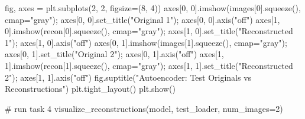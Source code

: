 \documentclass[
  letterpaper,
  DIV=11,
  numbers=noendperiod]{scrartcl}
\newenvironment{Shaded}{\begin{snugshade}}{\end{snugshade}}
\newcommand{\CommentTok}[1]{\textcolor[rgb]{0.37,0.37,0.37}{#1}}
\newcommand{\DecValTok}[1]{\textcolor[rgb]{0.68,0.00,0.00}{#1}}
\newcommand{\NormalTok}[1]{\textcolor[rgb]{0.00,0.23,0.31}{#1}}
\newcommand{\OperatorTok}[1]{\textcolor[rgb]{0.37,0.37,0.37}{#1}}
\newcommand{\StringTok}[1]{\textcolor[rgb]{0.13,0.47,0.30}{#1}}
\begin{document}
\begin{Shaded}
\begin{Highlighting}[]
\NormalTok{    fig, axes }\OperatorTok{=}\NormalTok{ plt.subplots(}\DecValTok{2}\NormalTok{, }\DecValTok{2}\NormalTok{, figsize}\OperatorTok{=}\NormalTok{(}\DecValTok{8}\NormalTok{, }\DecValTok{4}\NormalTok{))}
\NormalTok{    axes[}\DecValTok{0}\NormalTok{, }\DecValTok{0}\NormalTok{].imshow(images[}\DecValTok{0}\NormalTok{].squeeze(), cmap}\OperatorTok{=}\StringTok{"gray"}\NormalTok{)}\OperatorTok{;}\NormalTok{ axes[}\DecValTok{0}\NormalTok{, }\DecValTok{0}\NormalTok{].set\_title(}\StringTok{"Original 1"}\NormalTok{)}\OperatorTok{;}\NormalTok{ axes[}\DecValTok{0}\NormalTok{, }\DecValTok{0}\NormalTok{].axis(}\StringTok{"off"}\NormalTok{)}
\NormalTok{    axes[}\DecValTok{1}\NormalTok{, }\DecValTok{0}\NormalTok{].imshow(recon[}\DecValTok{0}\NormalTok{].squeeze(),   cmap}\OperatorTok{=}\StringTok{"gray"}\NormalTok{)}\OperatorTok{;}\NormalTok{ axes[}\DecValTok{1}\NormalTok{, }\DecValTok{0}\NormalTok{].set\_title(}\StringTok{"Reconstructed 1"}\NormalTok{)}\OperatorTok{;}\NormalTok{ axes[}\DecValTok{1}\NormalTok{, }\DecValTok{0}\NormalTok{].axis(}\StringTok{"off"}\NormalTok{)}
\NormalTok{    axes[}\DecValTok{0}\NormalTok{, }\DecValTok{1}\NormalTok{].imshow(images[}\DecValTok{1}\NormalTok{].squeeze(), cmap}\OperatorTok{=}\StringTok{"gray"}\NormalTok{)}\OperatorTok{;}\NormalTok{ axes[}\DecValTok{0}\NormalTok{, }\DecValTok{1}\NormalTok{].set\_title(}\StringTok{"Original 2"}\NormalTok{)}\OperatorTok{;}\NormalTok{ axes[}\DecValTok{0}\NormalTok{, }\DecValTok{1}\NormalTok{].axis(}\StringTok{"off"}\NormalTok{)}
\NormalTok{    axes[}\DecValTok{1}\NormalTok{, }\DecValTok{1}\NormalTok{].imshow(recon[}\DecValTok{1}\NormalTok{].squeeze(),   cmap}\OperatorTok{=}\StringTok{"gray"}\NormalTok{)}\OperatorTok{;}\NormalTok{ axes[}\DecValTok{1}\NormalTok{, }\DecValTok{1}\NormalTok{].set\_title(}\StringTok{"Reconstructed 2"}\NormalTok{)}\OperatorTok{;}\NormalTok{ axes[}\DecValTok{1}\NormalTok{, }\DecValTok{1}\NormalTok{].axis(}\StringTok{"off"}\NormalTok{)}
\NormalTok{    fig.suptitle(}\StringTok{"Autoencoder: Test Originals vs Reconstructions"}\NormalTok{)}
\NormalTok{    plt.tight\_layout()}
\NormalTok{    plt.show()}

\CommentTok{\# run task 4}
\NormalTok{visualize\_reconstructions(model, test\_loader, num\_images}\OperatorTok{=}\DecValTok{2}\NormalTok{)}
\end{Highlighting}
\end{Shaded}
\end{document}
